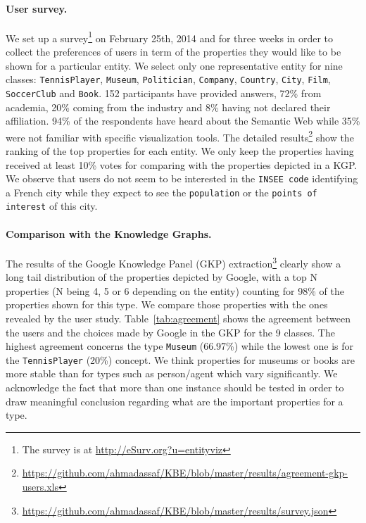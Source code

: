 \paragraph{User survey.}
\label{sec:survey}
We set up a survey\footnote{The survey is at \url{http://eSurv.org?u=entityviz}} on February 25th, 2014 and for three weeks in order to collect the preferences of users in term of the properties they would like to be shown for a particular entity. We select only one representative entity for nine classes: \texttt{TennisPlayer}, \texttt{Museum}, \texttt{Politician}, \texttt{Company}, \texttt{Country}, \texttt{City}, \texttt{Film}, \texttt{SoccerClub} and \texttt{Book}. 152 participants have provided answers, 72\% from academia, 20\% coming from the industry and 8\% having not declared their affiliation. 94\% of the respondents have heard about the Semantic Web while 35\% were not familiar with specific visualization tools. The detailed results\footnote{\url{https://github.com/ahmadassaf/KBE/blob/master/results/agreement-gkp-users.xls}} show the ranking of the top properties for each entity. We only keep the properties having received at least 10\% votes for comparing with the properties depicted in a KGP. We observe that users do not seem to be interested in the \texttt{INSEE code} identifying a French city while they expect to see the \texttt{population} or the \texttt{points of interest} of this city.

\paragraph{Comparison with the Knowledge Graphs.}
\label{sec:comparison}
The results of the Google Knowledge Panel (GKP) extraction\footnote{\url{https://github.com/ahmadassaf/KBE/blob/master/results/survey.json}} clearly show a long tail distribution of the properties depicted by Google, with a top N properties (N being 4, 5 or 6 depending on the entity) counting for 98\% of the properties shown for this type. We compare those properties with the ones revealed by the user study. Table~\ref{tab:agreement} shows the agreement between the users and the choices made by Google in the GKP for the 9 classes. The highest agreement concerns the type \texttt{Museum} (66.97\%) while the lowest one is for the \texttt{TennisPlayer} (20\%) concept. We think properties for museums or books are more stable than for types such as person/agent which vary significantly. We acknowledge the fact that more than one instance should be tested in order to draw meaningful conclusion regarding what are the important properties for a type.

